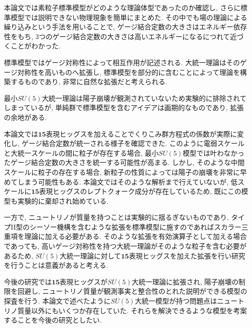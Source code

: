 %
%
本論文では素粒子標準模型がどのような理論体型であったのか確認し, さらに標準模型では説明できない物理現象を簡単にまとめた.
その中でも場の理論による繰り込みという手法を用いることで,  ゲージ結合定数の大きさはエネルギー依存性をもち, 3つのゲージ結合定数の大きさは高いエネルギーになるにつれて近づくことがわかった.

標準模型ではゲージ対称性によって相互作用が記述される.
大統一理論はそのゲージ対称性を高いものへ拡張し, 標準模型を部分的に含むことによって理論を構築するものであり, 非常に自然な拡張だと考えられる.

最小$SU(5)$大統一理論は陽子崩壊が観測されていないため実験的に排除されてしまっているが, 単純群で標準模型を含むアイデアは画期的なものであり, 拡張の余地がある.

本論文では$\bm{15}$表現ヒッグスを加えることでくりこみ群方程式の係数が実際に変化し, ゲージ結合定数が統一される様子を確認できた.
このように電弱スケールと大統一スケールの間に粒子が存在する場合, 最小$SU(5)$模型では叶わなかったゲージ結合定数の大きさを統一する可能性が高まる.
しかし, そのような中間スケールに粒子の存在する場合, 新粒子の性質によっては陽子の崩壊を非常に早めてしまう可能性もある.
本論文ではそのような解析まで行えていないが, 低スケールに$\bm{15}$表現ヒッグスのレプトクォーク成分が存在しているため, 既にこの模型も実験的に棄却され始めている\cite{collaborationSearchProtonDecay2020}.

一方で, ニュートリノが質量を持つことは実験的に揺るぎないものであり, タイプII型のシーソー機構を含むような拡張を標準模型に施すのであればスカラー三重項を理論に加える必要がある.
そのような拡張を有効演算子として加える場合であっても, 高いゲージ対称性を持つ大統一理論がそのような粒子を含む必要があるため, $SU(5)$大統一理論に対して$\bm{15}$表現ヒッグスを加えた拡張を行い研究を行うことは意義があると考える.

今後の研究では$\bm{15}$表現ヒッグスが$SU(5)$大統一理論に拡張され, 陽子崩壊の制限を回避し, ニュートリノ質量が観測事実と整合性のとれた説明ができる模型の探査を行う.
本論文で述べたように$SU(5)$大統一模型が持つ問題点はニュートリノ質量以外にもいくつか存在していた.
それらを解決できるような模型を考案することを今後の研究としたい.

